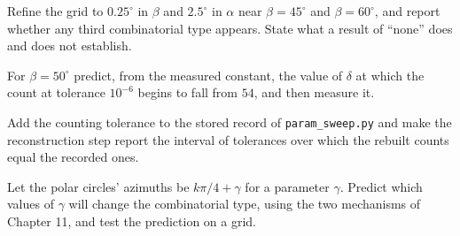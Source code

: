 \begin{exercise}
Refine the grid to $0.25^\circ$ in $\beta$ and $2.5^\circ$ in $\alpha$ near $\beta=45^\circ$ and $\beta=60^\circ$, and report whether any third combinatorial type appears. State what a result of ``none'' does and does not establish.
\end{exercise}

\begin{exercise}
For $\beta=50^\circ$ predict, from the measured constant, the value of $\delta$ at which the count at tolerance $10^{-6}$ begins to fall from $54$, and then measure it.
\end{exercise}

\begin{exercise}
Add the counting tolerance to the stored record of \texttt{param\_sweep.py} and make the reconstruction step report the interval of tolerances over which the rebuilt counts equal the recorded ones.
\end{exercise}

\begin{exercise}
Let the polar circles' azimuths be $k\pi/4+\gamma$ for a parameter $\gamma$. Predict which values of $\gamma$ will change the combinatorial type, using the two mechanisms of Chapter 11, and test the prediction on a grid.
\end{exercise}
